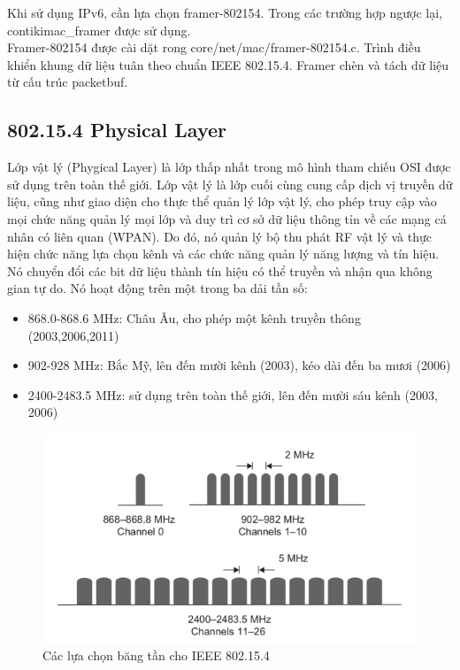 \documentclass{report}
\begin{document}
Khi sử dụng IPv6, cần lựa chọn framer-802154. Trong các trường hợp ngược lại,
contikimac\_framer được sử dụng. \\

Framer-802154 được cài dặt rong core/net/mac/framer-802154.c. Trình điều khiển
khung dữ liệu tuân theo chuẩn IEEE 802.15.4. Framer chèn và tách dữ liệu từ cấu
trúc packetbuf.
\subsection{802.15.4 Physical Layer}
Lớp vật lý (Phygical Layer) là lớp thấp nhất trong mô hình tham chiếu OSI được sử dụng
trên toàn thế giới. Lớp vật lý là lớp cuối cùng cung cấp dịch vị truyền dữ liệu, cũng như giao
diện cho thực thể quản lý lớp vật lý, cho phép truy cập vào mọi chức năng quản lý mọi lớp và
duy trì cơ sở dữ liệu thông tỉn về các mạng cá nhân có liên quan (WPAN). Do đó, nó quản lý
bộ thu phát RF vật lý và thực hiện chức năng lựa chọn kênh và các chức năng quản lý năng
lượng và tín hiệu. Nó chuyển đổi các bit dữ liệu thành tín hiệu có thể truyền và nhận qua không
gian tự do. Nó hoạt động trên một trong ba dải tần số:
\begin{itemize}
	\item 868.0-868.6 MHz: Châu Âu, cho phép một kênh truyền thông (2003,2006,2011)
	\item 902-928 MHz: Bắc Mỹ, lên đến mười kênh (2003), kéo dài đến ba mươi (2006)
	\item 2400-2483.5 MHz: sử dụng trên toàn thế giới, lên đến mười sáu kênh (2003, 2006)
\end{itemize}
\begin{figure}[h]
	\centering
	\includegraphics[scale = 0.7]{fig31.png}
	\caption{Các lựa chọn băng tần cho IEEE 802.15.4}
	\label{fig:Graph31}
\end{figure}
\end{document}
